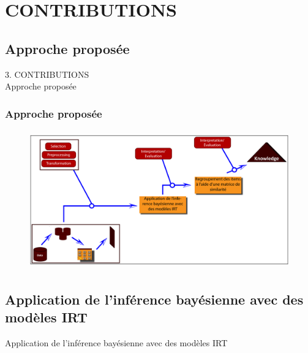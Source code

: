 \documentclass[aspectratio=169,professionalfonts, 12pt]{beamer}
\begin{document}
\section{CONTRIBUTIONS}

\subsection{Approche proposée}


\begin{frame}
  \justifying 
  \begin{minipage}{\textwidth}
    \begin{center}
      \Huge \textcolor{blueforest}{3. CONTRIBUTIONS} \\
      \vspace{0.5em}
      \huge \hspace{0.5em} Approche proposée
    \end{center}
  \end{minipage}
\end{frame}


\begin{frame}
  \frametitle{Approche proposée}
  \justifying 
  \begin{minipage}{\textwidth}
  \begin{figure}[H]
      \includegraphics[height=6cm]{images/contribution/aproche.png}
  \end{figure}
  \end{minipage}
\end{frame}


\subsection{Application de l'inférence bayésienne avec des modèles IRT}

\begin{frame}
  \justifying 
  \begin{minipage}{\textwidth}
    \begin{center}
      \huge Application de l'inférence bayésienne avec des modèles IRT
    \end{center}
  \end{minipage}
\end{frame}
\end{document}
